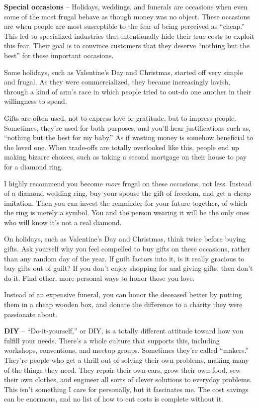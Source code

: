 \textbf{Special occasions} -- Holidays, weddings, and funerals are occasions when even some of the most frugal behave as though money was no object. These occasions are when people are most susceptible to the fear of being perceived as ``cheap.'' This led to specialized industries that intentionally hide their true costs to exploit this fear. Their goal is to convince customers that they deserve ``nothing but the best'' for these important occasions.

Some holidays, such as Valentine's Day and Christmas, started off very simple and frugal. As they were commercialized, they became increasingly lavish, through a kind of arm's race in which people tried to out-do one another in their willingness to spend.

Gifts are often used, not to express love or gratitude, but to impress people. Sometimes, they're used for both purposes, and you'll hear justifications such as, ``nothing but the best for my baby.'' As if wasting money is somehow beneficial to the loved one. When trade-offs are totally overlooked like this, people end up making bizarre choices, such as taking a second mortgage on their house to pay for a diamond ring.

I highly recommend you become \emph{more} frugal on these occasions, not less. Instead of a diamond wedding ring, buy your spouse the gift of freedom, and get a cheap imitation. Then you can invest the remainder for your future together, of which the ring is merely a symbol. You and the person wearing it will be the only ones who will know it's not a real diamond.

On holidays, such as Valentine's Day and Christmas, think twice before buying gifts. Ask yourself why you feel compelled to buy gifts on these occasions, rather than any random day of the year. If guilt factors into it, is it really gracious to buy gifts out of guilt? If you don't enjoy shopping for and giving gifts, then don't do it. Find other, more personal ways to honor those you love.

Instead of an expensive funeral, you can honor the deceased better by putting them in a cheap wooden box, and donate the difference to a charity they were passionate about.

\textbf{DIY} -- ``Do-it-yourself,'' or DIY, is a totally different attitude toward how you fulfill your needs. There's a whole culture that supports this, including workshops, conventions, and meetup groups. Sometimes they're called ``makers.'' They're people who get a thrill out of solving their own problems, making many of the things they need. They repair their own cars, grow their own food, sew their own clothes, and engineer all sorts of clever solutions to everyday problems. This isn't something I care for personally, but it fascinates me. The cost savings can be enormous, and no list of how to cut costs is complete without it.

